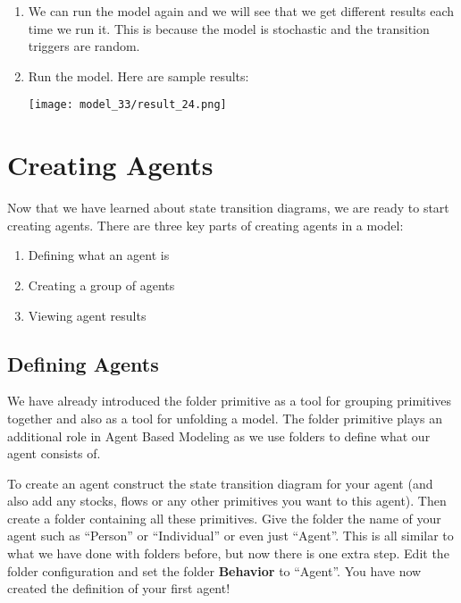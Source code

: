\documentclass[]{memoir}
\makeatletter
\def\maxwidth{\ifdim\Gin@nat@width>\linewidth\linewidth
\else\Gin@nat@width\fi}
\let\Oldincludegraphics\includegraphics
\renewcommand{\includegraphics}[1]{\Oldincludegraphics[width=\maxwidth]{#1}}
\renewcommand{\u}[1]{\textbf{#1}}
\makeatother
\begin{document}
\begin{oframed}
\begin{enumerate}
\item 

We can run the model again and we will see that we get different results each time we run it. This is because the model is stochastic and the transition triggers are random.


\item Run the model. Here are sample results:\par \begin{minipage}{\linewidth}  \centering \texttt{[image: model\_33/result\_24.png]}
\end{minipage}

\end{enumerate} \end{oframed}

\section{Creating Agents}

Now that we have learned about state transition diagrams, we are ready
to start creating agents. There are three key parts of creating agents
in a model:

\begin{enumerate}
\def\labelenumi{\arabic{enumi}.}
\itemsep1pt\parskip0pt
\item
  Defining what an agent is
\item
  Creating a group of agents
\item
  Viewing agent results
\end{enumerate}

\subsection{Defining Agents}

We have already introduced the folder primitive as a tool for grouping
primitives together and also as a tool for unfolding a model. The folder
primitive plays an additional role in Agent Based Modeling as we use
folders to define what our agent consists of.

To create an agent construct the state transition diagram for your agent
(and also add any stocks, flows or any other primitives you want to this
agent). Then create a folder containing all these primitives. Give the
folder the name of your agent such as ``Person'' or ``Individual'' or
even just ``Agent''. This is all similar to what we have done with
folders before, but now there is one extra step. Edit the folder
configuration and set the folder \u{Behavior} to ``Agent''. You have now
created the definition of your first agent!
\end{document}
